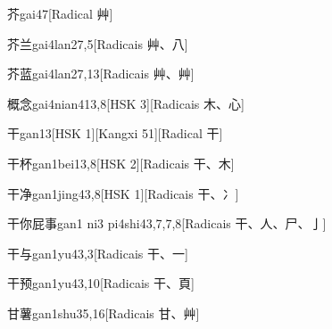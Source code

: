 \begin{entry}{芥}{gai4}{7}[Radical ⾋]
\end{entry}

\begin{entry}{芥兰}{gai4lan2}{7,5}[Radicais ⾋、⼋]
\end{entry}

\begin{entry}{芥蓝}{gai4lan2}{7,13}[Radicais ⾋、⾋]
\end{entry}

\begin{entry}{概念}{gai4nian4}{13,8}[HSK 3][Radicais ⽊、⼼]
\end{entry}

\begin{entry}{干}{gan1}{3}[HSK 1][Kangxi 51][Radical ⼲]
\end{entry}

\begin{entry}{干杯}{gan1bei1}{3,8}[HSK 2][Radicais ⼲、⽊]
\end{entry}

\begin{entry}{干净}{gan1jing4}{3,8}[HSK 1][Radicais ⼲、⼎]
\end{entry}

\begin{entry}{干你屁事}{gan1 ni3 pi4shi4}{3,7,7,8}[Radicais ⼲、⼈、⼫、⼅]
\end{entry}

\begin{entry}{干与}{gan1yu4}{3,3}[Radicais ⼲、⼀]
\end{entry}

\begin{entry}{干预}{gan1yu4}{3,10}[Radicais ⼲、⾴]
\end{entry}

\begin{entry}{甘薯}{gan1shu3}{5,16}[Radicais ⽢、⾋]
\end{entry}

